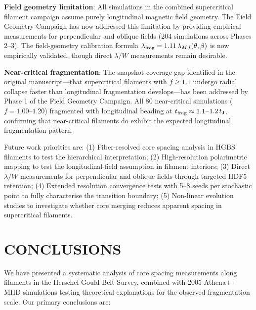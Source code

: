 \documentclass[twoside,twocolumn]{mnras}
\begin{document}
\textbf{Field geometry limitation}: All simulations in the combined supercritical filament campaign assume purely longitudinal magnetic field geometry. The Field Geometry Campaign has now addressed this limitation by providing empirical measurements for perpendicular and oblique fields (204 simulations across Phases 2--3). The field-geometry calibration formula $\lambda_{\rm frag} = 1.11\,\lambda_{MJ}(\theta, \beta)$ is now empirically validated, though direct $\lambda/W$ measurements remain desirable.

\textbf{Near-critical fragmentation}: The snapshot coverage gap identified in the original manuscript---that supercritical filaments with $f \geq 1.1$ undergo radial collapse faster than longitudinal fragmentation develops---has been addressed by Phase 1 of the Field Geometry Campaign. All 80 near-critical simulations ($f = 1.00$--$1.20$) fragmented with longitudinal beading at $t_{\rm frag} \approx 1.1$--$1.2\,t_{\rm J}$, confirming that near-critical filaments do exhibit the expected longitudinal fragmentation pattern.

Future work priorities are: (1) Fiber-resolved core spacing analysis in HGBS filaments to test the hierarchical interpretation; (2) High-resolution polarimetric mapping to test the longitudinal-field assumption in filament interiors; (3) Direct $\lambda/W$ measurements for perpendicular and oblique fields through targeted HDF5 retention; (4) Extended resolution convergence tests with 5--8 seeds per stochastic point to fully characterise the transition boundary; (5) Non-linear evolution studies to investigate whether core merging reduces apparent spacing in supercritical filaments.

\section{CONCLUSIONS}

We have presented a systematic analysis of core spacing measurements along filaments in the Herschel Gould Belt Survey, combined with 2005 Athena++ MHD simulations testing theoretical explanations for the observed fragmentation scale. Our primary conclusions are:
\end{document}
